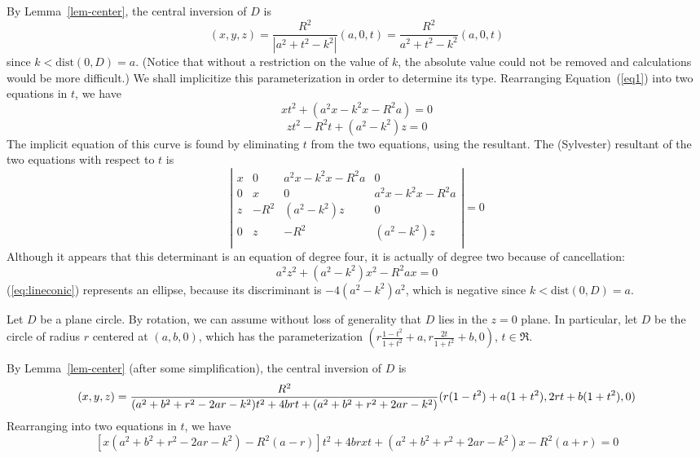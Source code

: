 By Lemma~\ref{lem-center}, the central inversion of $D$ is
\begin{equation}
\label{eq1}
	(x,y,z) = \frac{R^{2}}{|a^{2} + t^{2} - k^{2}|} (a,0,t) 
		= \frac{R^{2}}{a^{2} + t^{2} - k^{2}} (a,0,t) 
\end{equation}
since $k < \mbox{dist}(0,D) = a$.
(Notice that without a restriction on the value of $k$, 
the absolute value could not be removed and calculations would be
more difficult.)
We shall implicitize this parameterization in order to determine its type.
Rearranging Equation~(\ref{eq1}) into two equations in $t$, we have
\[ xt^{2} + (a^{2}x - k^{2}x - R^{2}a) = 0 \]
\[ zt^{2} - R^{2}t + (a^{2} - k^{2})z = 0  \]
The implicit equation of this curve is found by eliminating $t$ from the
two equations, using the resultant.
The (Sylvester) resultant of the two equations with respect to $t$ is
\[ \left| \begin{array}{cccc}
	x & 0 & a^{2}x - k^{2}x - R^{2}a & 0 \\
	0 & x & 0 & a^{2}x - k^{2}x - R^{2}a \\
	z & -R^{2} & (a^{2} - k^{2})z & 0 \\
	0 & z & -R^{2} & (a^{2} - k^{2})z \\
	\end{array} \right| = 0 \]
Although it appears that this determinant is an equation of degree
four, it is actually of degree two because of cancellation:
\begin{equation}
\label{eq:lineconic}
a^{2} z^{2} + (a^{2} - k^{2}) x^{2} - R^{2} a x = 0 
\end{equation}
%
(\ref{eq:lineconic}) represents an ellipse, because
its discriminant is $- 4(a^{2} - k^{2})a^{2}$, which is 
negative since $k < \mbox{dist}(0,D) = a$.

Let $D$ be a plane circle.
By rotation, we can assume without loss of generality that 
$D$ lies in the $z=0$ plane.
In particular, let $D$ be the circle of radius
$r$ centered at $(a,b,0)$, which has the parameterization 
$(r\frac{1-t^{2}}{1+t^{2}} + a, r \frac{2t}{1+t^{2}} + b, 0)$, $t \in \Re$.

By Lemma~\ref{lem-center} (after some simplification),
the central inversion of $D$ is
\[ 
\scriptsize{(x,y,z) = 
\frac{R^{2}}{(a^{2} + b^{2} + r^{2} - 2ar - k^{2})t^{2} + 4brt + 
	     (a^{2} + b^{2} + r^{2} + 2ar - k^{2})} 
	(r(1-t^{2}) + a(1+t^{2}), 2rt + b(1 + t^{2}), 0)}
\]
Rearranging into two equations in $t$, we have
\[ [x(a^{2} + b^{2} + r^{2} - 2ar - k^{2}) - R^{2}(a-r)]t^{2} 
   + 4brxt 
   + (a^{2} + b^{2} + r^{2} + 2ar - k^{2})x - R^{2}(a + r) = 0 \]

